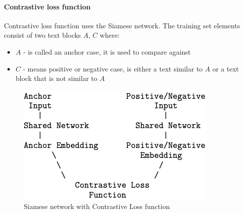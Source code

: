 \documentclass{wseas}
\begin{document}
\paragraph{Contrastive loss function}

Contrastive loss function uses the Siamese network. The training set
elements consist of two text blocks \(A\), \(C\) where:

\begin{itemize}

\item
  \(A\) - is called an anchor case, it is used to compare against
\item
  \(C\) - means positive or negative case, is either a text similar to
  \(A\) or a text block that is not similar to \(A\)
\end{itemize}



\begin{figure}[htbp]
  \centering
  \includegraphics[width=\linewidth]{resources/v1/contrastiveLoss.png}
  \caption{Siamese network with Contrastive Loss function}
  \label{fig:contrastive_loss_function_figure}
\end{figure}
\end{document}
